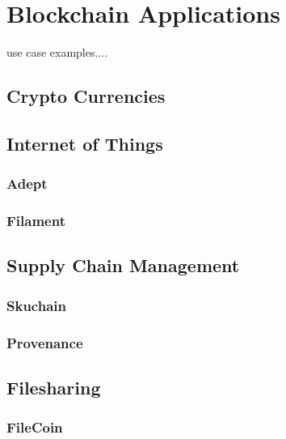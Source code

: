 \section{Blockchain Applications}
use case examples....
\subsection{Crypto Currencies}
\subsection{Internet of Things}
\subsubsection{Adept}
\subsubsection{Filament}
\subsection{Supply Chain Management}
\subsubsection{Skuchain}
\subsubsection{Provenance}
\subsection{Filesharing}
\subsubsection{FileCoin}
